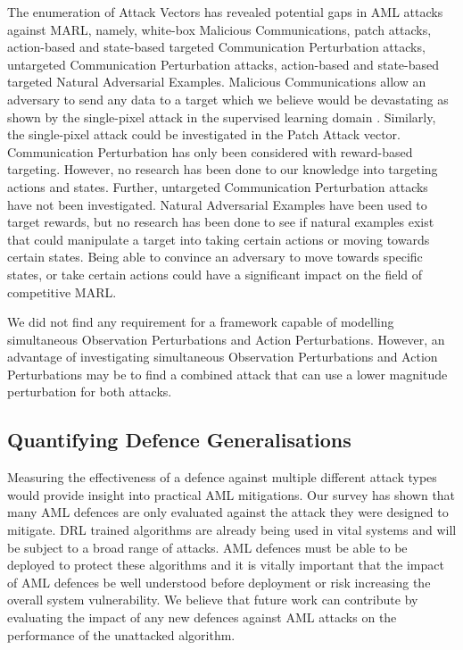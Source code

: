 \documentclass[conference,compsoc]{IEEEtran}
\begin{document}
The enumeration of Attack Vectors has revealed potential gaps in AML attacks against MARL, namely, white-box Malicious Communications, patch attacks, action-based and state-based targeted Communication Perturbation attacks, untargeted Communication Perturbation attacks, action-based and state-based targeted Natural Adversarial Examples. Malicious Communications allow an adversary to send any data to a target which we believe would be devastating as shown by the single-pixel attack in the supervised learning domain \cite{su_one_2019}. Similarly, the single-pixel attack could be investigated in the Patch Attack vector. Communication Perturbation has only been considered with reward-based targeting. However, no research has been done to our knowledge into targeting actions and states. Further, untargeted Communication Perturbation attacks have not been investigated. Natural Adversarial Examples have been used to target rewards, but no research has been done to see if natural examples exist that could manipulate a target into taking certain actions or moving towards certain states. Being able to convince an adversary to move towards specific states, or take certain actions could have a significant impact on the field of competitive MARL.

We did not find any requirement for a framework capable of modelling simultaneous Observation Perturbations and Action Perturbations. However, an advantage of investigating simultaneous Observation Perturbations and Action Perturbations may be to find a combined attack that can use a lower magnitude perturbation for both attacks.

\subsection{Quantifying Defence Generalisations}
Measuring the effectiveness of a defence against multiple different attack types would provide insight into practical AML mitigations. Our survey has shown that many AML defences are only evaluated against the attack they were designed to mitigate. DRL trained algorithms are already being used in vital systems and will be subject to a broad range of attacks. AML defences must be able to be deployed to protect these algorithms and it is vitally important that the impact of AML defences be well understood before deployment or risk increasing the overall system vulnerability. We believe that future work can contribute by evaluating the impact of any new defences against AML attacks on the performance of the unattacked algorithm.
\end{document}

